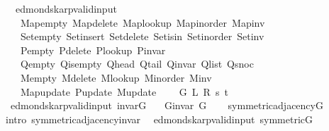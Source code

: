 \begin{isabellebody}
\ \ \ edmonds{\isacharunderscore}{\kern0pt}karp{\isacharunderscore}{\kern0pt}valid{\isacharunderscore}{\kern0pt}input\isanewline
\ \ \ \ Map{\isacharunderscore}{\kern0pt}empty\ Map{\isacharunderscore}{\kern0pt}delete\ Map{\isacharunderscore}{\kern0pt}lookup\ Map{\isacharunderscore}{\kern0pt}inorder\ Map{\isacharunderscore}{\kern0pt}inv\isanewline
\ \ \ \ Set{\isacharunderscore}{\kern0pt}empty\ Set{\isacharunderscore}{\kern0pt}insert\ Set{\isacharunderscore}{\kern0pt}delete\ Set{\isacharunderscore}{\kern0pt}isin\ Set{\isacharunderscore}{\kern0pt}inorder\ Set{\isacharunderscore}{\kern0pt}inv\isanewline
\ \ \ \ P{\isacharunderscore}{\kern0pt}empty\ P{\isacharunderscore}{\kern0pt}delete\ P{\isacharunderscore}{\kern0pt}lookup\ P{\isacharunderscore}{\kern0pt}invar\isanewline
\ \ \ \ Q{\isacharunderscore}{\kern0pt}empty\ Q{\isacharunderscore}{\kern0pt}is{\isacharunderscore}{\kern0pt}empty\ Q{\isacharunderscore}{\kern0pt}head\ Q{\isacharunderscore}{\kern0pt}tail\ Q{\isacharunderscore}{\kern0pt}invar\ Q{\isacharunderscore}{\kern0pt}list\ Q{\isacharunderscore}{\kern0pt}snoc\isanewline
\ \ \ \ M{\isacharunderscore}{\kern0pt}empty\ M{\isacharunderscore}{\kern0pt}delete\ M{\isacharunderscore}{\kern0pt}lookup\ M{\isacharunderscore}{\kern0pt}inorder\ M{\isacharunderscore}{\kern0pt}inv\isanewline
\ \ \ \ Map{\isacharunderscore}{\kern0pt}update\ P{\isacharunderscore}{\kern0pt}update\ M{\isacharunderscore}{\kern0pt}update\isanewline
\ \ \ \ G\ L\ R\ s\ t{\isachardoublequoteclose}\isanewline
\isanewline
{}\isamarkupfalse%
\ {\isacharparenleft}{\kern0pt}\ edmonds{\isacharunderscore}{\kern0pt}karp{\isacharunderscore}{\kern0pt}valid{\isacharunderscore}{\kern0pt}input{\isacharparenright}{\kern0pt}\ invar{\isacharunderscore}{\kern0pt}G{\isacharcolon}{\kern0pt}\isanewline
\ \ \ {\isachardoublequoteopen}G{\isachardot}{\kern0pt}invar\ G{\isachardoublequoteclose}%
\endisataginvisible
{\isafoldinvisible}%
%
\isadeliminvisible
\isanewline
%
\endisadeliminvisible
%
\isadelimproof
\ \ %
\endisadelimproof
%
\isatagproof
{}\isamarkupfalse%
\ symmetric{\isacharunderscore}{\kern0pt}adjacency{\isacharunderscore}{\kern0pt}G\isanewline
\ \ \isamarkupfalse%
\ {\isacharparenleft}{\kern0pt}intro\ symmetric{\isacharunderscore}{\kern0pt}adjacency{\isachardot}{\kern0pt}invar{\isacharparenright}{\kern0pt}%
\endisatagproof
{\isafoldproof}%
%
\isadelimproof
\isanewline
%
\endisadelimproof
%
\isadeliminvisible
\isanewline
%
\endisadeliminvisible
%
\isataginvisible
{}\isamarkupfalse%
\ {\isacharparenleft}{\kern0pt}\ edmonds{\isacharunderscore}{\kern0pt}karp{\isacharunderscore}{\kern0pt}valid{\isacharunderscore}{\kern0pt}input{\isacharparenright}{\kern0pt}\ symmetric{\isacharunderscore}{\kern0pt}G{\isacharcolon}{\kern0pt}\isanewline

\end{isabellebody}
